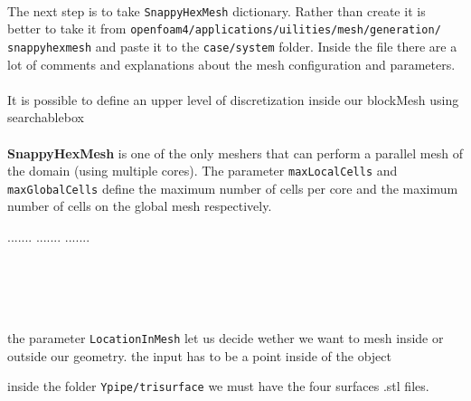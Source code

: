 \documentclass[12pt, titlepage]{article}
\begin{document}
\paragraph{}The next step is to take \texttt{SnappyHexMesh} dictionary. Rather than create it is better to take it from \texttt{openfoam4/applications/uilities/mesh/generation/\\snappyhexmesh} and paste it to the \texttt{case/system} folder. Inside the file there are a lot of comments and explanations about the mesh configuration and parameters.

\paragraph{}It is possible to define an upper level of discretization inside our blockMesh using searchablebox

\paragraph{}\textbf{SnappyHexMesh} is one of the only meshers that can perform a parallel mesh of the domain (using multiple cores). The parameter \texttt{maxLocalCells} and \texttt{maxGlobalCells} define the maximum number of cells per core and the maximum number of cells on the global mesh respectively.



.......
.......
.......\\\\\\\\\


the parameter \texttt{LocationInMesh} let us decide wether we want to mesh inside or outside our geometry. the input has to be a point inside of the object

inside the folder \texttt{Ypipe/trisurface} we must have the four surfaces .stl files.



\pagebreak


\end{document}
